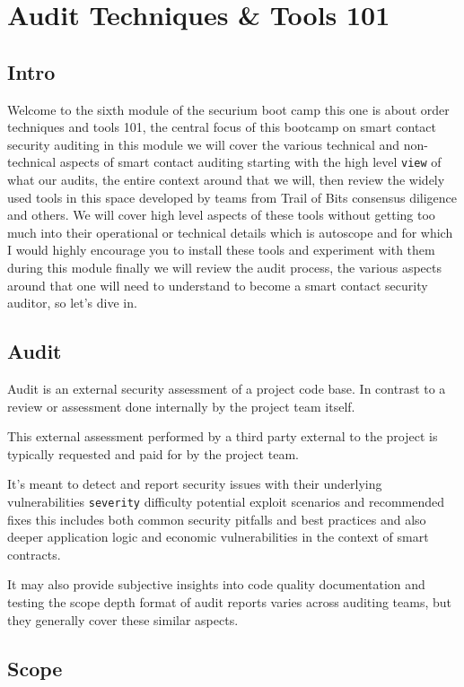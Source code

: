 \chapter{Audit Techniques \& Tools 101}

\section*{Intro}
Welcome to the sixth module of the securium boot camp this one is about order techniques and tools 101, the central focus of this bootcamp on smart contact security auditing in this module we will cover the various technical and non-technical aspects of smart contact auditing starting with the high level \verb|view| of what our audits, the entire context around that we will, then review the widely used tools in this space developed by teams from Trail of Bits consensus diligence and others. We will cover high level aspects of these tools without getting too much into their operational or technical details which is autoscope and for which I would highly encourage you to install these tools and experiment with them during this module finally we will review the audit process, the various aspects around that one will need to understand to become a smart contact security auditor, so let's dive in.
\section{Audit}
Audit is an external security assessment of a project code base. In contrast to a review or assessment done internally by the project team itself. 

This external assessment performed by a third party external to the project is typically requested and paid for by the project team.

It's meant to detect and report security issues with their underlying vulnerabilities \verb|severity| difficulty potential exploit scenarios and recommended fixes this includes both common security pitfalls and best practices and also deeper application logic and economic vulnerabilities in the context of smart contracts.

It may also provide subjective insights into code quality documentation and testing the scope depth format of audit reports varies across auditing teams, but they generally cover these similar aspects.

\section{Scope}

